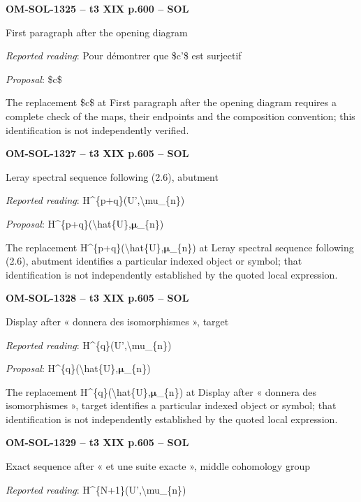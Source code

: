 \par\noindent\textbf{OM-SOL-1325 -- t3 XIX p.600 -- SOL}\par
First paragraph after the opening diagram\par
\emph{Reported reading}: Pour démontrer que \$c'\$ est surjectif\par
\emph{Proposal}: \$c\$\par
The replacement \$c\$ at First paragraph after the opening diagram requires a complete check of the maps, their endpoints and the composition convention; this identification is not independently verified.\par
\par\noindent\textbf{OM-SOL-1327 -- t3 XIX p.605 -- SOL}\par
Leray spectral sequence following (2.6), abutment\par
\emph{Reported reading}: H\textasciicircum{}\{p+q\}(U',\textbackslash{}mu\_\{n\})\par
\emph{Proposal}: H\textasciicircum{}\{p+q\}(\textbackslash{}hat\{U\},\ensuremath{𝛍}\_\{n\})\par
The replacement H\textasciicircum{}\{p+q\}(\textbackslash{}hat\{U\},\ensuremath{𝛍}\_\{n\}) at Leray spectral sequence following (2.6), abutment identifies a particular indexed object or symbol; that identification is not independently established by the quoted local expression.\par
\par\noindent\textbf{OM-SOL-1328 -- t3 XIX p.605 -- SOL}\par
Display after « donnera des isomorphismes », target\par
\emph{Reported reading}: H\textasciicircum{}\{q\}(U',\textbackslash{}mu\_\{n\})\par
\emph{Proposal}: H\textasciicircum{}\{q\}(\textbackslash{}hat\{U\},\ensuremath{𝛍}\_\{n\})\par
The replacement H\textasciicircum{}\{q\}(\textbackslash{}hat\{U\},\ensuremath{𝛍}\_\{n\}) at Display after « donnera des isomorphismes », target identifies a particular indexed object or symbol; that identification is not independently established by the quoted local expression.\par
\par\noindent\textbf{OM-SOL-1329 -- t3 XIX p.605 -- SOL}\par
Exact sequence after « et une suite exacte », middle cohomology group\par
\emph{Reported reading}: H\textasciicircum{}\{N+1\}(U',\textbackslash{}mu\_\{n\})\par
